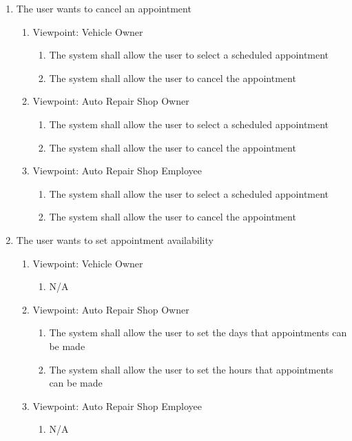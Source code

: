 \documentclass[12pt]{article}
\begin{document}
\begin{enumerate}[resume*=business_events]
	\item The user wants to cancel an appointment
	      \begin{enumerate}[VP\arabic*.]
		      \item Viewpoint: Vehicle Owner
		            \begin{enumerate}
			            \item The system shall allow the user to select a scheduled appointment
			            \item The system shall allow the user to cancel the appointment
		            \end{enumerate}
		      \item Viewpoint: Auto Repair Shop Owner
		            \begin{enumerate}
			            \item The system shall allow the user to select a scheduled appointment
			            \item The system shall allow the user to cancel the appointment
		            \end{enumerate}
		      \item Viewpoint: Auto Repair Shop Employee
		            \begin{enumerate}
			            \item The system shall allow the user to select a scheduled appointment
			            \item The system shall allow the user to cancel the appointment
		            \end{enumerate}
	      \end{enumerate}

	\item The user wants to set appointment availability
	      \begin{enumerate}[VP\arabic*.]
		      \item Viewpoint: Vehicle Owner
		            \begin{enumerate}
			            \item[] N/A
		            \end{enumerate}
		      \item Viewpoint: Auto Repair Shop Owner
		            \begin{enumerate}
			            \item The system shall allow the user to set the days that appointments can be made
			            \item The system shall allow the user to set the hours that appointments can be made
		            \end{enumerate}
		      \item Viewpoint: Auto Repair Shop Employee
		            \begin{enumerate}
			            \item[] N/A
		            \end{enumerate}
	      \end{enumerate}
\end{enumerate}
\end{document}
